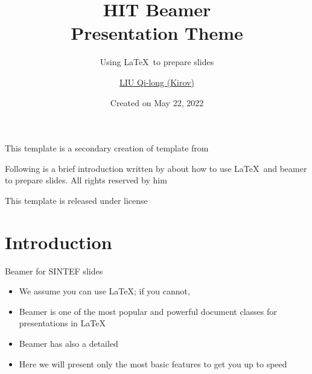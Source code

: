 \documentclass{beamer}
\title{HIT Beamer\\ Presentation Theme}
\subtitle{Using \LaTeX\ to prepare slides}
\author{\href{mailto:qilong-kirov.liu@connect.hit.cn}{LIU Qi-long (Kirov)}}
\date{Created on May 22, 2022}
\begin{document}
\maketitle

\begin{frame}

This template is a secondary creation of  template from  \vspace{\baselineskip}

Following is a brief introduction written by  about how to use \LaTeX\ and beamer to prepare slides. All rights reserved by him\vspace{\baselineskip}

This template is released under  license

\end{frame}

\section{Introduction}

\begin{frame}{Beamer for SINTEF slides}{\thesection \, \secname}

\begin{itemize}
\item We assume you can use \LaTeX; if you cannot,
\item Beamer is one of the most popular and powerful document
classes for presentations in \LaTeX
\item Beamer has also a detailed
\item Here we will present only the most basic features to get you up to speed
\end{itemize}
\end{frame}
\end{document}

